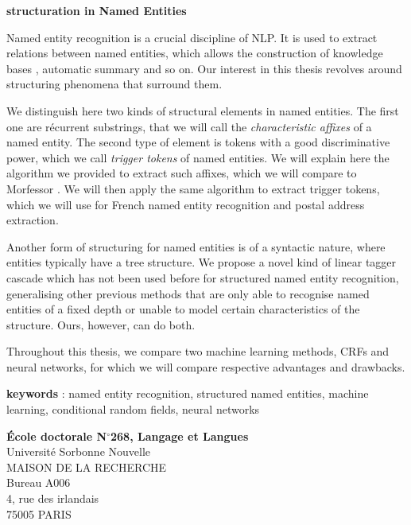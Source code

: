 \documentclass[12pt,a4paper,times,twoside,openright]{report}
\begin{document}
\vspace{0.2em}

\begin{center}\textbf{structuration in Named Entities}\end{center}
\small{
Named entity recognition is a crucial discipline of NLP. It is used to extract relations between named entities, which allows the construction of knowledge bases \citep{surdeanu2014overview}, automatic summary \citep{nobata2002summarization} and so on. Our interest in this thesis revolves around structuring phenomena that surround them.

We distinguish here two kinds of structural elements in named entities. The first one are récurrent substrings, that we will call the \emph{characteristic affixes} of a named entity. The second type of element is tokens with a good discriminative power, which we call \emph{trigger tokens} of named entities. We will explain here the algorithm we provided to extract such affixes, which we will compare to Morfessor \citep{creutz2005unsupervised}. We will then apply the same algorithm to extract trigger tokens, which we will use for French named entity recognition and postal address extraction.

Another form of structuring for named entities is of a syntactic nature, where entities typically have a tree structure. We propose a novel kind of linear tagger cascade which has not been used before for structured named entity recognition, generalising other previous methods that are only able to recognise named entities of a fixed depth or unable to model certain characteristics of the structure. Ours, however, can do both.

Throughout this thesis, we compare two machine learning methods, CRFs and neural networks, for which we will compare respective advantages and drawbacks.

\begin{flushleft}
\textbf{keywords} : named entity recognition, structured named entities, machine learning, conditional random fields, neural networks
\end{flushleft}

 }

\vspace{0.25em}

\begin{flushleft}
\textbf{École doctorale N$^{\circ}$268, Langage et Langues}\\
Université Sorbonne Nouvelle \\
MAISON DE LA RECHERCHE \\
Bureau A006 \\
4, rue des irlandais \\
75005 PARIS
\end{flushleft}
\end{document}

